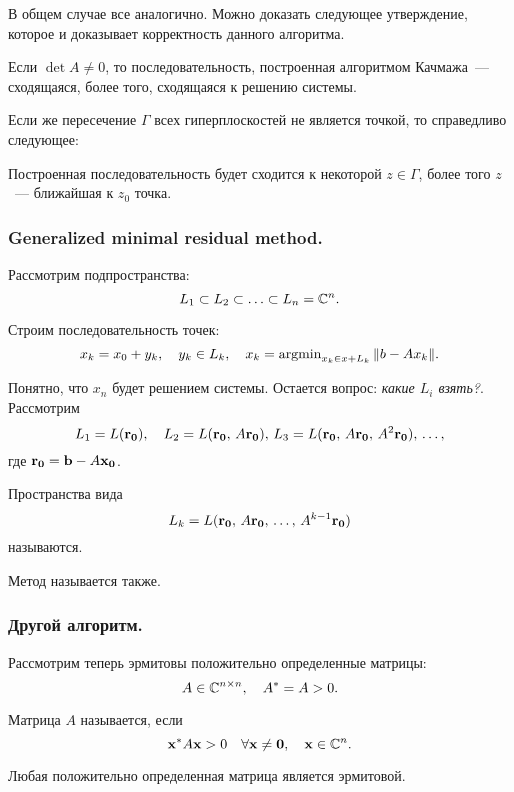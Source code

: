 В общем случае все аналогично. Можно доказать следующее утверждение, которое
и доказывает корректность данного алгоритма.

\begin{claim}
    Если $\det A\neq 0$, то последовательность, построенная алгоритмом
    Качмажа~--- сходящаяся, более того, сходящаяся к решению системы.
\end{claim}

Если же пересечение $\Gamma$ всех гиперплоскостей не является точкой, то справедливо следующее:
\begin{claim}
    Построенная последовательность будет сходится к некоторой $z\in\Gamma$, более
    того $z$~--- ближайшая к $z_0$ точка.
\end{claim}

\subsubsection{Generalized minimal residual method.}

Рассмотрим подпространства: \[
    L_1\subset L_2\subset\ldots\subset L_n=\mathbb{C}^{n}.
\]

Строим последовательность точек: \[
    x_k=x_0+y_k,\quad y_k\in L_k,\quad x_k=\operatorname{argmin}_{x_k\in x+L_k}\|b-Ax_k\|.
\]

Понятно, что $x_n$ будет решением системы. Остается вопрос: \textit{какие $L_i$ взять?}.
Рассмотрим \[
    L_1=L(\mathbf{r_0}),\quad L_2=L(\mathbf{r_0},\, A\mathbf{r_0}),\,
    L_3=L(\mathbf{r_0},\, A\mathbf{r_0},\, A^2\mathbf{r_0}),\,\ldots,
\]
где $\mathbf{r_0}=\mathbf{b}-A\mathbf{x_0}$.

\begin{remark}
    Пространства вида \[L_k=L(\mathbf{r_0},\, A\mathbf{r_0},\, \ldots,\, A^{k-1}\mathbf{r_0})\]
    называются.
\end{remark}

\begin{remark}
    Метод называется также.
\end{remark}

\subsubsection{Другой алгоритм.}

Рассмотрим теперь эрмитовы положительно определенные матрицы:
\[
    A\in\mathbb{C}^{n\times n},\quad A^*=A>0.
\]

\begin{definition}
    Матрица $A$ называется, если
    \[\mathbf{x}^*A\mathbf{x}>0\quad \forall \mathbf{x}\neq \mathbf{0},\quad \mathbf{x}\in\mathbb{C}^n.\]
\end{definition}

\begin{claim}
    Любая положительно определенная матрица является эрмитовой.
\end{claim}
